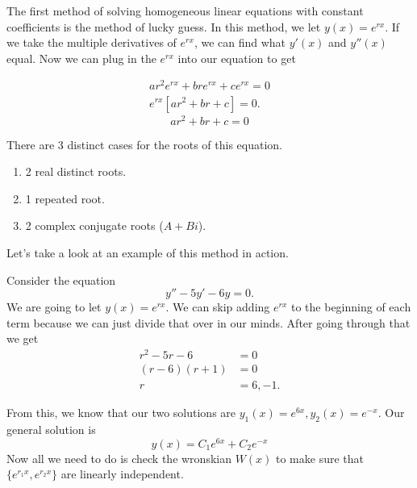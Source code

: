   The first method of solving homogeneous linear equations with constant coefficients is the method of lucky guess. In this method, we let $y(x)=e^{rx}$. If we take the multiple derivatives of $e^{rx}$, we can find what $y'(x)$ and $y''(x)$ equal. Now we can plug in the $e^{rx}$ into our equation to get 

  \begin{align*}
    ar^2e^{rx}+bre^{rx}+ce^{rx}=0\\
    e^{rx}[ar^2+br+c]=0
  .\end{align*}
  \begin{equation}
    \boxed{ar^2+br+c=0}
  \end{equation}
  
  There are 3 distinct cases for the roots of this equation.
  \begin{enumerate}
    \item 2 real distinct roots.
    \item 1 repeated root.
    \item 2 complex conjugate roots ($A+Bi$).
  \end{enumerate}

  Let's take a look at an example of this method in action.

  \begin{problem}
    Consider the equation 
    \[
    y''-5y'-6y=0
    .\] 
    We are going to let $y(x)=e^{rx}$. We can skip adding $e^{rx}$ to the beginning of each term because we can just divide that over in our minds. After going through that we get 
    \begin{align*}
      r^2-5r-6&=0\\
      (r-6)(r+1)&=0\\
      r&=6,-1
    .\end{align*}
    
    From this, we know that our two solutions are $y_1(x)=e^{6x},y_2(x)=e^{-x}$. Our general solution is 
    \begin{equation}
      \boxed{y(x)=C_1 e^{6x}+C_2e^{-x}}
    \end{equation}
    Now all we need to do is check the wronskian $W(x)$ to make sure that $\{e^{r_1x},e^{r_2x}\}$ are linearly independent.
  \end{problem}

